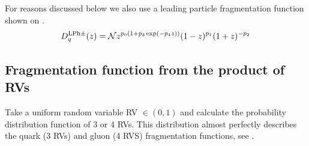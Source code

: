 \documentclass[12pt]{article}
\begin{document}
For reasons discussed below we also use a leading particle fragmentation function \cite{Renk:2007rn} shown on .
\begin{equation}\label{eq:LPFF}
D^{\rm LP h\pm}_{q}(z) = \mathcal{N} z^{p_0(1+p_3\exp(-p_4 z))}  (1-z)^{p_1}(1+z)^{-p_2} 
\end{equation}

\clearpage	
\subsection{Fragmentation function from the product of RVs}

Take a uniform random variable RV $\in(0,1)$ and calculate the probability distribution function of 3 or 4 RVs.
This distribution almost perfectly describes the quark (3 RVs) and gluon (4 RVS) fragmentation functions, see .
\end{document}

